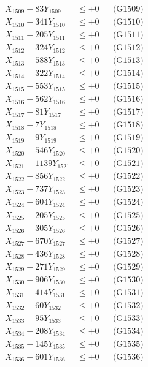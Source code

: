 \documentclass[a4paper,10pt]{article}
\begin{document}
{\begin{align}
X_{1509} - 83Y_{1509} &\leq +0 && \text{(G1509)} \\
X_{1510} - 341Y_{1510} &\leq +0 && \text{(G1510)} \\
\allowbreak
X_{1511} - 205Y_{1511} &\leq +0 && \text{(G1511)} \\
X_{1512} - 324Y_{1512} &\leq +0 && \text{(G1512)} \\
X_{1513} - 588Y_{1513} &\leq +0 && \text{(G1513)} \\
X_{1514} - 322Y_{1514} &\leq +0 && \text{(G1514)} \\
X_{1515} - 553Y_{1515} &\leq +0 && \text{(G1515)} \\
X_{1516} - 562Y_{1516} &\leq +0 && \text{(G1516)} \\
X_{1517} - 81Y_{1517} &\leq +0 && \text{(G1517)} \\
X_{1518} - 7Y_{1518} &\leq +0 && \text{(G1518)} \\
X_{1519} - 9Y_{1519} &\leq +0 && \text{(G1519)} \\
X_{1520} - 546Y_{1520} &\leq +0 && \text{(G1520)} \\
\allowbreak
X_{1521} - 1139Y_{1521} &\leq +0 && \text{(G1521)} \\
X_{1522} - 856Y_{1522} &\leq +0 && \text{(G1522)} \\
X_{1523} - 737Y_{1523} &\leq +0 && \text{(G1523)} \\
X_{1524} - 604Y_{1524} &\leq +0 && \text{(G1524)} \\
X_{1525} - 205Y_{1525} &\leq +0 && \text{(G1525)} \\
X_{1526} - 305Y_{1526} &\leq +0 && \text{(G1526)} \\
X_{1527} - 670Y_{1527} &\leq +0 && \text{(G1527)} \\
X_{1528} - 436Y_{1528} &\leq +0 && \text{(G1528)} \\
X_{1529} - 271Y_{1529} &\leq +0 && \text{(G1529)} \\
X_{1530} - 906Y_{1530} &\leq +0 && \text{(G1530)} \\
\allowbreak
X_{1531} - 414Y_{1531} &\leq +0 && \text{(G1531)} \\
X_{1532} - 60Y_{1532} &\leq +0 && \text{(G1532)} \\
X_{1533} - 95Y_{1533} &\leq +0 && \text{(G1533)} \\
X_{1534} - 208Y_{1534} &\leq +0 && \text{(G1534)} \\
X_{1535} - 145Y_{1535} &\leq +0 && \text{(G1535)} \\
X_{1536} - 601Y_{1536} &\leq +0 && \text{(G1536)} \\

\end{align}}
\end{document}
